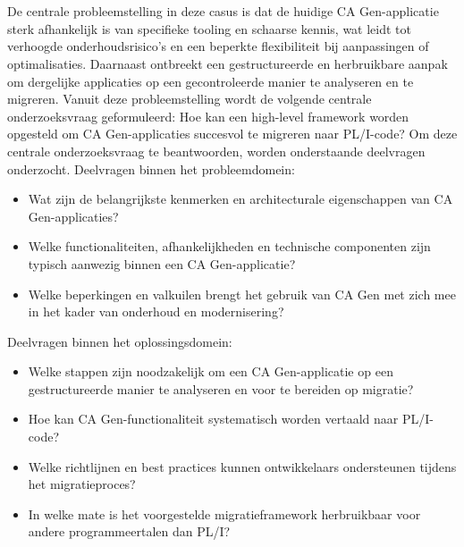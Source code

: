 \section{}%
\label{sec:onderzoeksvraag}

De centrale probleemstelling in deze casus is dat de huidige CA Gen-applicatie sterk afhankelijk is van specifieke 
tooling en schaarse kennis, wat leidt tot verhoogde onderhoudsrisico’s en een beperkte flexibiliteit bij aanpassingen 
of optimalisaties. Daarnaast ontbreekt een gestructureerde en herbruikbare aanpak om dergelijke applicaties op 
een gecontroleerde manier te analyseren en te migreren.
Vanuit deze probleemstelling wordt de volgende centrale onderzoeksvraag geformuleerd:
Hoe kan een high-level framework worden opgesteld om CA Gen-applicaties succesvol te migreren naar PL/I-code?
Om deze centrale onderzoeksvraag te beantwoorden, worden onderstaande deelvragen onderzocht.
Deelvragen binnen het probleemdomein:
\begin{itemize}
    \item Wat zijn de belangrijkste kenmerken en architecturale eigenschappen van CA Gen-applicaties?
    \item Welke functionaliteiten, afhankelijkheden en technische componenten zijn typisch aanwezig binnen een CA Gen-applicatie?
    \item Welke beperkingen en valkuilen brengt het gebruik van CA Gen met zich mee in het kader van onderhoud en modernisering?
\end{itemize}

Deelvragen binnen het oplossingsdomein:
\begin{itemize}
    \item Welke stappen zijn noodzakelijk om een CA Gen-applicatie op een gestructureerde manier te analyseren en voor te bereiden op migratie?
    \item Hoe kan CA Gen-functionaliteit systematisch worden vertaald naar PL/I-code?
    \item Welke richtlijnen en best practices kunnen ontwikkelaars ondersteunen tijdens het migratieproces?
    \item In welke mate is het voorgestelde migratieframework herbruikbaar voor andere programmeertalen dan PL/I?
\end{itemize}

\section{}%
\label{sec:onderzoeksdoelstelling}

